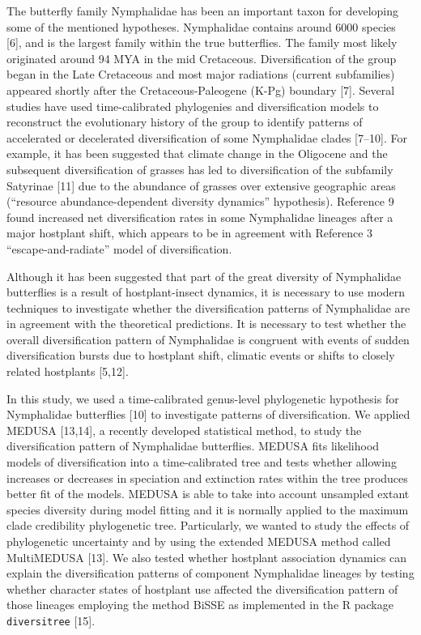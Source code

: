 \documentclass[]{article}
\begin{document}
The butterfly family Nymphalidae has been an important taxon for
developing some of the mentioned hypotheses. Nymphalidae contains around
6000 species {[}6{]}, and is the largest family within the true
butterflies. The family most likely originated around 94 MYA in the mid
Cretaceous. Diversification of the group began in the Late Cretaceous
and most major radiations (current subfamilies) appeared shortly after
the Cretaceous-Paleogene (K-Pg) boundary {[}7{]}. Several studies have
used time-calibrated phylogenies and diversification models to
reconstruct the evolutionary history of the group to identify patterns
of accelerated or decelerated diversification of some Nymphalidae clades
{[}7--10{]}. For example, it has been suggested that climate change in
the Oligocene and the subsequent diversification of grasses has led to
diversification of the subfamily Satyrinae {[}11{]} due to the abundance
of grasses over extensive geographic areas (``resource
abundance-dependent diversity dynamics'' hypothesis). Reference 9 found
increased net diversification rates in some Nymphalidae lineages after a
major hostplant shift, which appears to be in agreement with Reference 3
``escape-and-radiate'' model of diversification.

Although it has been suggested that part of the great diversity of
Nymphalidae butterflies is a result of hostplant-insect dynamics, it is
necessary to use modern techniques to investigate whether the
diversification patterns of Nymphalidae are in agreement with the
theoretical predictions. It is necessary to test whether the overall
diversification pattern of Nymphalidae is congruent with events of
sudden diversification bursts due to hostplant shift, climatic events or
shifts to closely related hostplants {[}5,12{]}.

In this study, we used a time-calibrated genus-level phylogenetic
hypothesis for Nymphalidae butterflies {[}10{]} to investigate patterns
of diversification. We applied MEDUSA {[}13,14{]}, a recently developed
statistical method, to study the diversification pattern of Nymphalidae
butterflies. MEDUSA fits likelihood models of diversification into a
time-calibrated tree and tests whether allowing increases or decreases
in speciation and extinction rates within the tree produces better fit
of the models. MEDUSA is able to take into account unsampled extant
species diversity during model fitting and it is normally applied to the
maximum clade credibility phylogenetic tree. Particularly, we wanted to
study the effects of phylogenetic uncertainty and by using the extended
MEDUSA method called MultiMEDUSA {[}13{]}. We also tested whether
hostplant association dynamics can explain the diversification patterns
of component Nymphalidae lineages by testing whether character states of
hostplant use affected the diversification pattern of those lineages
employing the method BiSSE as implemented in the R package
\texttt{diversitree} {[}15{]}.
\end{document}
